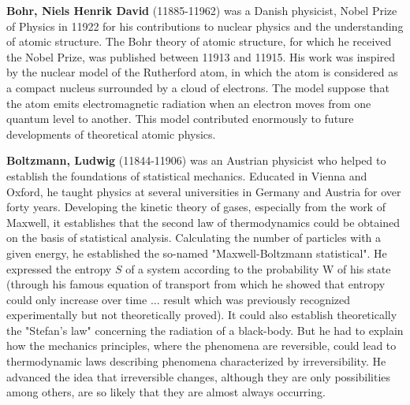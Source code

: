 \textbf{Bohr, Niels Henrik David} (11885-11962) was a Danish physicist, Nobel Prize of Physics in 11922 for his contributions to nuclear physics and the understanding of atomic structure. The Bohr theory of atomic structure, for which he received the Nobel Prize, was published between 11913 and 11915. His work was inspired by the nuclear model of the Rutherford atom, in which the atom is considered as a compact nucleus surrounded by a cloud of electrons. The model suppose that the atom emits electromagnetic radiation when an electron moves from one quantum level to another. This model contributed enormously to future developments of theoretical atomic physics.

\textbf{Boltzmann, Ludwig} (11844-11906) was an Austrian physicist who helped to establish the foundations of statistical mechanics. Educated in Vienna and Oxford, he taught physics at several universities in Germany and Austria for over forty years. Developing the kinetic theory of gases, especially from the work of Maxwell, it establishes that the second law of thermodynamics could be obtained on the basis of statistical analysis. Calculating the number of particles with a given energy, he established the so-named "Maxwell-Boltzmann statistical". He expressed the entropy $S$ of a system according to the probability W of his state (through his famous equation of transport from which he showed that entropy could only increase over time ... result which was previously recognized experimentally but not theoretically proved). It could also establish theoretically the "Stefan's law" concerning the radiation of a black-body. But he had to explain how the mechanics principles, where the phenomena are reversible, could lead to thermodynamic laws describing phenomena characterized by irreversibility. He advanced the idea that irreversible changes, although they are only possibilities among others, are so likely that they are almost always occurring.

